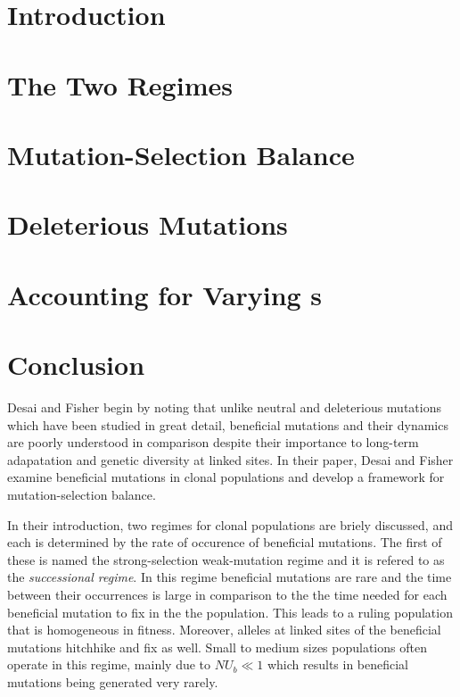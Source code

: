 \documentclass[12pt,twocolumn]{article}
\begin{document}

\newpage
\section{Introduction}
\section{The Two Regimes}
\section{Mutation-Selection Balance}
\section{Deleterious Mutations}
\section{Accounting for Varying s}
\section{Conclusion}
Desai and Fisher \cite{DesFish07} begin by noting that unlike neutral and deleterious mutations which have been studied in great detail, beneficial mutations and their dynamics are poorly understood in comparison despite their importance to long-term adapatation and genetic diversity at linked sites.  In their paper, Desai and Fisher examine beneficial mutations in clonal populations and develop a framework for mutation-selection balance.  

In their introduction, two regimes for clonal populations are briely discussed, and each is determined by the rate of occurence of beneficial mutations.  The first of these is named the strong-selection weak-mutation regime and it is refered to as the \textit{successional regime}.  In this regime beneficial mutations are rare and the time between their occurrences is large in comparison to the the time needed for each beneficial mutation to fix in the the population.  This leads to a ruling population that is homogeneous in fitness. Moreover, alleles at linked sites of the beneficial mutations hitchhike and fix as well.  Small to medium sizes populations often operate in this regime, mainly due to $NU_b \ll 1$ which results in beneficial mutations being generated very rarely. 
\end{document}
